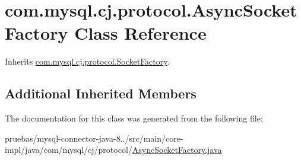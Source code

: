 \hypertarget{classcom_1_1mysql_1_1cj_1_1protocol_1_1_async_socket_factory}{}\section{com.\+mysql.\+cj.\+protocol.\+Async\+Socket\+Factory Class Reference}
\label{classcom_1_1mysql_1_1cj_1_1protocol_1_1_async_socket_factory}


Inherits \mbox{\hyperlink{interfacecom_1_1mysql_1_1cj_1_1protocol_1_1_socket_factory}{com.\+mysql.\+cj.\+protocol.\+Socket\+Factory}}.

\subsection*{Additional Inherited Members}


The documentation for this class was generated from the following file\+:\begin{DoxyCompactItemize}
\item 
pruebas/mysql-\/connector-\/java-\/8../src/main/core-\/impl/java/com/mysql/cj/protocol/\mbox{\hyperlink{_async_socket_factory_8java}{Async\+Socket\+Factory.\+java}}\end{DoxyCompactItemize}
